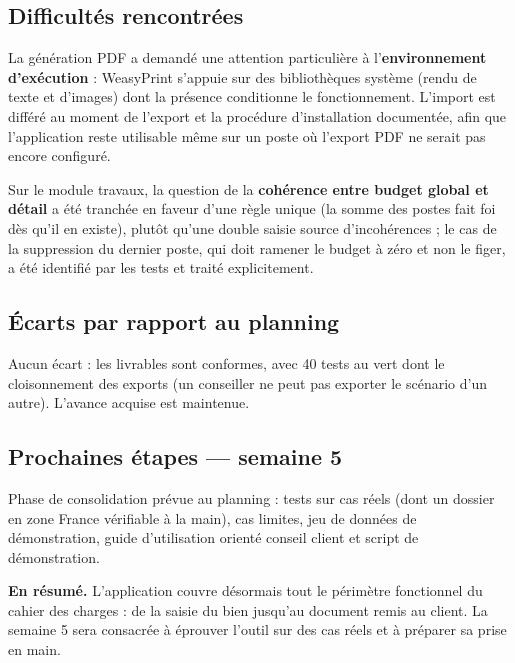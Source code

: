 \documentclass[11pt,a4paper]{article}
\begin{document}

\subsection{Difficultés rencontrées}
La génération PDF a demandé une attention particulière à l'\textbf{environnement d'exécution} : WeasyPrint s'appuie sur des bibliothèques système (rendu de texte et d'images) dont la présence conditionne le fonctionnement. L'import est différé au moment de l'export et la procédure d'installation documentée, afin que l'application reste utilisable même sur un poste où l'export PDF ne serait pas encore configuré.

Sur le module travaux, la question de la \textbf{cohérence entre budget global et détail} a été tranchée en faveur d'une règle unique (la somme des postes fait foi dès qu'il en existe), plutôt qu'une double saisie source d'incohérences ; le cas de la suppression du dernier poste, qui doit ramener le budget à zéro et non le figer, a été identifié par les tests et traité explicitement.

\subsection{Écarts par rapport au planning}
Aucun écart : les livrables sont conformes, avec 40 tests au vert dont le cloisonnement des exports (un conseiller ne peut pas exporter le scénario d'un autre). L'avance acquise est maintenue.

\subsection{Prochaines étapes --- semaine 5}
Phase de consolidation prévue au planning : tests sur cas réels (dont un dossier en zone France vérifiable à la main), cas limites, jeu de données de démonstration, guide d'utilisation orienté conseil client et script de démonstration.

\vspace{0.6cm}
\begin{tcolorbox}[colback=eccblue!5,colframe=eccblue!60,boxrule=0.6pt,arc=2pt,
	left=8pt,right=8pt,top=6pt,bottom=6pt]
	\small
	\textbf{\color{eccblue}En résumé.} L'application couvre désormais tout le périmètre fonctionnel du cahier des charges : de la saisie du bien jusqu'au document remis au client. La semaine 5 sera consacrée à éprouver l'outil sur des cas réels et à préparer sa prise en main.
\end{tcolorbox}
\end{document}
